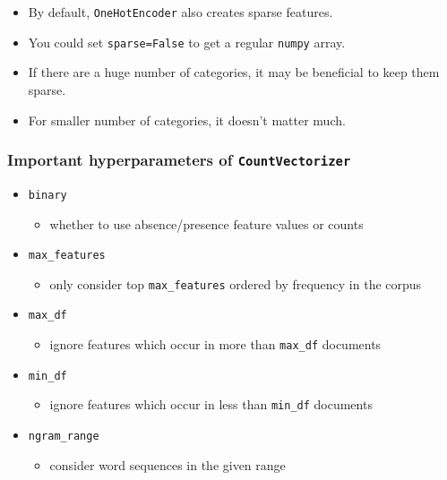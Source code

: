 \documentclass[11pt]{article}
\providecommand{\tightlist}{%
      \setlength{\itemsep}{0pt}\setlength{\parskip}{0pt}}
\begin{document}
\begin{itemize}
\tightlist
\item
  By default, \texttt{OneHotEncoder} also creates sparse features.
\item
  You could set \texttt{sparse=False} to get a regular \texttt{numpy}
  array.
\item
  If there are a huge number of categories, it may be beneficial to keep
  them sparse.
\item
  For smaller number of categories, it doesn't matter much.
\end{itemize}

    \subsubsection{\texorpdfstring{Important hyperparameters of
\texttt{CountVectorizer}}{Important hyperparameters of CountVectorizer}}\label{important-hyperparameters-of-countvectorizer}

\begin{itemize}
\tightlist
\item
  \texttt{binary}

  \begin{itemize}
  \tightlist
  \item
    whether to use absence/presence feature values or counts
  \end{itemize}
\item
  \texttt{max\_features}

  \begin{itemize}
  \tightlist
  \item
    only consider top \texttt{max\_features} ordered by frequency in the
    corpus
  \end{itemize}
\item
  \texttt{max\_df}

  \begin{itemize}
  \tightlist
  \item
    ignore features which occur in more than \texttt{max\_df} documents
  \end{itemize}
\item
  \texttt{min\_df}

  \begin{itemize}
  \tightlist
  \item
    ignore features which occur in less than \texttt{min\_df} documents
  \end{itemize}
\item
  \texttt{ngram\_range}

  \begin{itemize}
  \tightlist
  \item
    consider word sequences in the given range
  \end{itemize}
\end{itemize}
\end{document}
